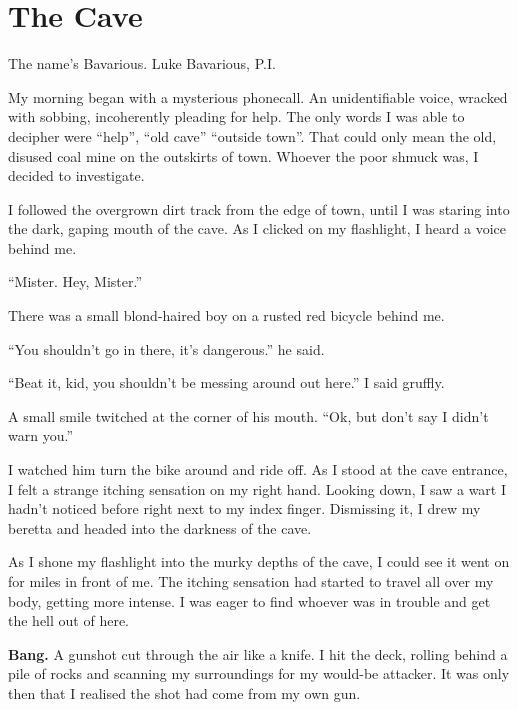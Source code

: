\chapter{The Cave}


The name's Bavarious. Luke Bavarious, P.I.



My morning began with a mysterious phonecall. An unidentifiable
voice, wracked with sobbing, incoherently pleading for help. The
only words I was able to decipher were ``help'', ``old cave'' ``outside
town''. That could only mean the old, disused coal mine on the
outskirts of town. Whoever the poor shmuck was, I decided to
investigate.



I followed the overgrown dirt track from the edge of town, until I
was staring into the dark, gaping mouth of the cave. As I clicked
on my flashlight, I heard a voice behind me.



``Mister. Hey, Mister.''



There was a small blond-haired boy on a rusted red bicycle behind
me.



``You shouldn't go in there, it's dangerous.'' he said.



``Beat it, kid, you shouldn't be messing around out here.'' I said
gruffly.



A small smile twitched at the corner of his mouth. ``Ok, but don't
say I didn't warn you.''



I watched him turn the bike around and ride off. As I stood at the
cave entrance, I felt a strange itching sensation on my right hand.
Looking down, I saw a wart I hadn't noticed before right next to my
index finger. Dismissing it, I drew my beretta and headed into the
darkness of the cave.





As I shone my flashlight into the murky depths of the cave, I could
see it went on for miles in front of me. The itching sensation had
started to travel all over my body, getting more intense. I was
eager to find whoever was in trouble and get the hell out of
here.



{\bf Bang.} A gunshot cut through the air like a knife. I hit the
deck, rolling behind a pile of rocks and scanning my surroundings
for my would-be attacker. It was only then that I realised the shot
had come from my own gun.



